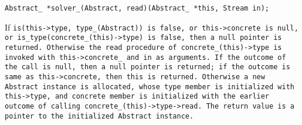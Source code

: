 
\tt{Abstract_ *solver_(Abstract, read)(Abstract_ *this, Stream in);}


\noindent If \tt{is(this->type, type_(Abstract))} is \tt{false},
or \tt{this->concrete} is null, or \tt{is_type(concrete_(this)->type)}
is \tt{false}, then a null pointer is returned.
Otherwise the \tt{read} procedure of \tt{concrete_(this)->type}
is invoked with \tt{this->concrete_} and \tt{in} as arguments.
If the outcome of the call is null, then a null pointer is returned;
if the outcome is same as \tt{this->concrete}, then \tt{this} is returned.
Otherwise a new \tt{Abstract} instance is allocated, whose \tt{type} member
is initialized with \tt{this->type}, and \tt{concrete} member is initialized
with the earlier outcome of calling \tt{concrete_(this)->type->read}.
The return value is a pointer to the initialized \tt{Abstract} instance.
